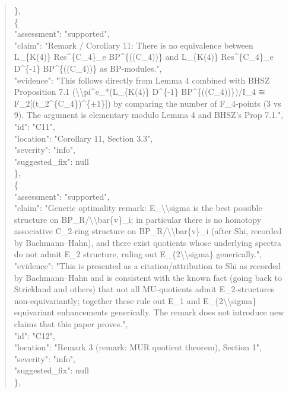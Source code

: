 \documentclass[11pt]{article}
\begin{document}
\begin{quote}
    \},\\
    \{\\
      "assessment": "supported",\\
      "claim": "Remark / Corollary 11: There is no equivalence between L\_\{K(4)\} Res\^{}\{C\_4\}\_e BP\^{}\{((C\_4))\}<2> and L\_\{K(4)\} Res\^{}\{C\_4\}\_e D\^{}\{-1\} BP\^{}\{((C\_4))\}<2> as BP-modules.",\\
      "evidence": "This follows directly from Lemma 4 combined with BHSZ Proposition 7.1 (\textbackslash{}\textbackslash{}pi\^{}e\_*(L\_\{K(4)\} D\^{}\{-1\} BP\^{}\{((C\_4))\}<2>)/I\_4 ≅ F\_2[(t\_2\^{}\{C\_4\})\^{}\{\ensuremath{\pm}1\}]) by comparing the number of F\_4-points (3 vs 9). The argument is elementary modulo Lemma 4 and BHSZ's Prop 7.1.",\\
      "id": "C11",\\
      "location": "Corollary 11, Section 3.3",\\
      "severity": "info",\\
      "suggested\_fix": null\\
    \},\\
    \{\\
      "assessment": "supported",\\
      "claim": "Generic optimality remark: E\_\textbackslash{}\textbackslash{}sigma is the best possible structure on BP\_R/\textbackslash{}\textbackslash{}bar\{v\}\_i; in particular there is no homotopy associative C\_2-ring structure on BP\_R/\textbackslash{}\textbackslash{}bar\{v\}\_i (after Shi, recorded by Bachmann--Hahn), and there exist quotients whose underlying spectra do not admit E\_2 structure, ruling out E\_\{2\textbackslash{}\textbackslash{}sigma\} generically.",\\
      "evidence": "This is presented as a citation/attribution to Shi as recorded by Bachmann--Hahn and is consistent with the known fact (going back to Strickland and others) that not all MU-quotients admit E\_2-structures non-equivariantly; together these rule out E\_1 and E\_\{2\textbackslash{}\textbackslash{}sigma\} equivariant enhancements generically. The remark does not introduce new claims that this paper proves.",\\
      "id": "C12",\\
      "location": "Remark 3 (remark: MUR quotient theorem), Section 1",\\
      "severity": "info",\\
      "suggested\_fix": null\\
    \},\\

\end{quote}
\end{document}
